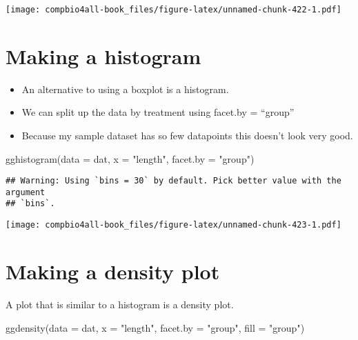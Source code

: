 \documentclass[
]{book}
\newenvironment{Shaded}{\begin{snugshade}}{\end{snugshade}}
\newcommand{\AttributeTok}[1]{\textcolor[rgb]{0.77,0.63,0.00}{#1}}
\newcommand{\FunctionTok}[1]{\textcolor[rgb]{0.00,0.00,0.00}{#1}}
\newcommand{\NormalTok}[1]{#1}
\newcommand{\StringTok}[1]{\textcolor[rgb]{0.31,0.60,0.02}{#1}}
\providecommand{\tightlist}{%
  \setlength{\itemsep}{0pt}\setlength{\parskip}{0pt}}
\begin{document}
\texttt{[image: compbio4all-book\_files/figure-latex/unnamed-chunk-422-1.pdf]}

\hypertarget{making-a-histogram-1}{%
\section{Making a histogram}\label{making-a-histogram-1}}

\begin{itemize}
\tightlist
\item
  An alternative to using a boxplot is a histogram.
\item
  We can split up the data by treatment using facet.by = ``group''
\item
  Because my sample dataset has so few datapoints this doesn't look very good.
\end{itemize}

\begin{Shaded}
\begin{Highlighting}[]
\FunctionTok{gghistogram}\NormalTok{(}\AttributeTok{data =}\NormalTok{ dat,}
          \AttributeTok{x =} \StringTok{"length"}\NormalTok{,}
          \AttributeTok{facet.by =} \StringTok{"group"}\NormalTok{)}
\end{Highlighting}
\end{Shaded}

\begin{verbatim}
## Warning: Using `bins = 30` by default. Pick better value with the argument
## `bins`.
\end{verbatim}

\texttt{[image: compbio4all-book\_files/figure-latex/unnamed-chunk-423-1.pdf]}

\hypertarget{making-a-density-plot-1}{%
\section{Making a density plot}\label{making-a-density-plot-1}}

A plot that is similar to a histogram is a density plot.

\begin{Shaded}
\begin{Highlighting}[]
\FunctionTok{ggdensity}\NormalTok{(}\AttributeTok{data =}\NormalTok{ dat,}
          \AttributeTok{x =} \StringTok{"length"}\NormalTok{,}
          \AttributeTok{facet.by =} \StringTok{"group"}\NormalTok{,}
          \AttributeTok{fill =} \StringTok{"group"}\NormalTok{)}
\end{Highlighting}
\end{Shaded}
\end{document}
